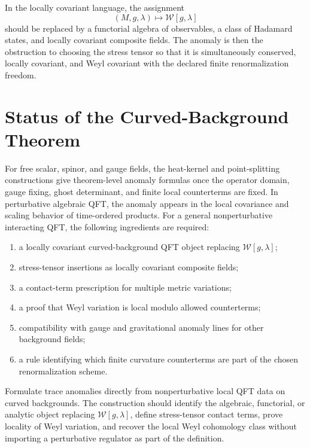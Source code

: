 In the locally covariant language, the assignment
\[
  (M,g,\lambda)\longmapsto \mathcal W[g,\lambda]
\]
should be replaced by a functorial algebra of observables, a class of
Hadamard states, and locally covariant composite fields.  The anomaly is then
the obstruction to choosing the stress tensor so that it is simultaneously
conserved, locally covariant, and Weyl covariant with the declared finite
renormalization freedom.

\section{Status of the Curved-Background Theorem}

For free scalar, spinor, and gauge fields, the heat-kernel and point-splitting
constructions give theorem-level anomaly formulas once the operator domain,
gauge fixing, ghost determinant, and finite local counterterms are fixed.  In
perturbative algebraic QFT, the anomaly appears in the local covariance and
scaling behavior of time-ordered products.  For a general nonperturbative
interacting QFT, the following ingredients are required:
\begin{enumerate}[label=(\roman*)]
\item a locally covariant curved-background QFT object replacing
  \(\mathcal W[g,\lambda]\);
\item stress-tensor insertions as locally covariant composite fields;
\item a contact-term prescription for multiple metric variations;
\item a proof that Weyl variation is local modulo allowed counterterms;
\item compatibility with gauge and gravitational anomaly lines for other
  background fields;
\item a rule identifying which finite curvature counterterms are part of the
  chosen renormalization scheme.
\end{enumerate}

\begin{openproblem}
\label{op:trace-anomaly-nonperturbative-data}
Formulate trace anomalies directly from nonperturbative local QFT data on
curved backgrounds.  The construction should identify the algebraic,
functorial, or analytic object replacing \(\mathcal W[g,\lambda]\), define
stress-tensor contact terms, prove locality of Weyl variation, and recover
the local Weyl cohomology class without importing a perturbative regulator as
part of the definition.
\end{openproblem}
